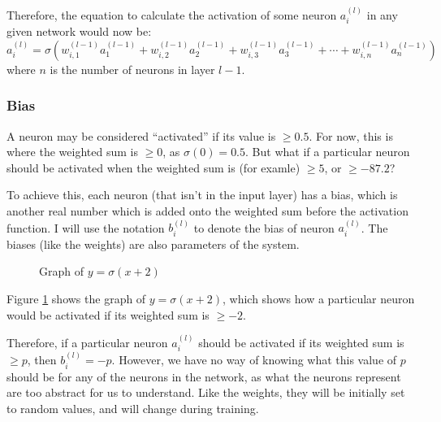 \documentclass[12pt]{report}
\begin{document}
Therefore, the equation to calculate the activation of some neuron $a^{\left(l\right)}_i$ in any given network would now be:
\begin{equation}
    a^{\left(l\right)}_i=\sigma \left(w^{\left(l-1\right)}_{i,1}a^{\left(l-1\right)}_1+w^{\left(l-1\right)}_{i,2}a^{\left(l-1\right)}_2+w^{\left(l-1\right)}_{i,3}a^{\left(l-1\right)}_3+\cdots +w^{\left(l-1\right)}_{i,n}a^{\left(l-1\right)}_n\right)
\end{equation}
where $n$ is the number of neurons in layer $l-1$.

\subsubsection{Bias}
A neuron may be considered ``activated'' if its value is $\geq 0.5$. For now, this is where the weighted sum is $\geq 0$, as $\sigma \left(0\right)=0.5$. But what if a particular neuron should be activated when the weighted sum is (for examle) $\geq 5$, or $\geq -87.2$?

To achieve this, each neuron (that isn't in the input layer) has a bias, which is another real number which is added onto the weighted sum before the activation function. I will use the notation $b^{\left(l\right)}_i$ to denote the bias of neuron $a^{\left(l\right)}_i$. The biases (like the weights) are also parameters of the system.

\begin{figure}[H]
\centering
{}
\caption{Graph of $y=\sigma \left(x+2\right)$}\label{fig:sigmoidXplus2}
\end{figure}

Figure \ref{fig:sigmoidXplus2} shows the graph of $y=\sigma \left(x+2\right)$, which shows how a particular neuron would be activated if its weighted sum is $\geq -2$.

Therefore, if a particular neuron $a^{\left(l\right)}_i$ should be activated if its weighted sum is $\geq p$, then $b^{\left(l\right)}_i=-p$. However, we have no way of knowing what this value of $p$ should be for any of the neurons in the network, as what the neurons represent are too abstract for us to understand. Like the weights, they will be initially set to random values, and will change during training.
\end{document}
